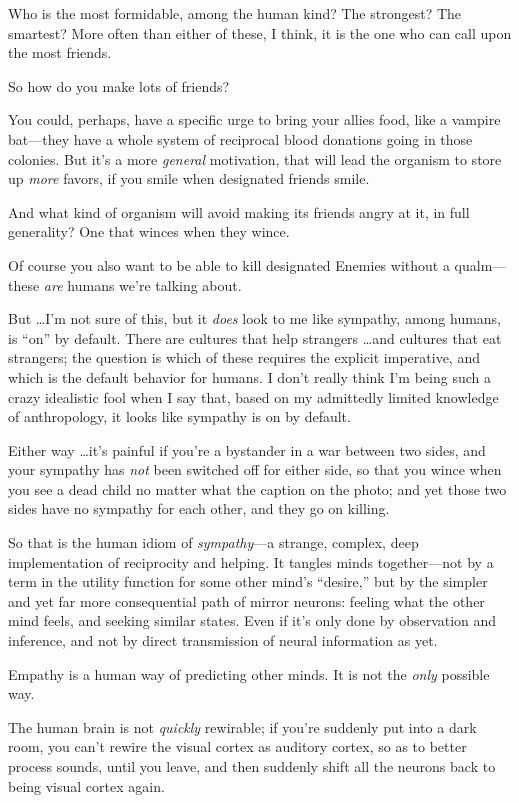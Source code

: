 {
 Who is the most formidable, among the human kind? The strongest?
The smartest? More often than either of these, I think, it is the one
who can call upon the most friends.}

{
 So how do you make lots of friends?}

{
 You could, perhaps, have a specific urge to bring your allies
food, like a vampire bat---they have a whole system of reciprocal blood
donations going in those colonies. But it's a more
\textit{general} motivation, that will lead the organism to store up
\textit{more} favors, if you smile when designated friends smile.}

{
 And what kind of organism will avoid making its friends angry at
it, in full generality? One that winces when they wince.}

{
 Of course you also want to be able to kill designated Enemies
without a qualm---these \textit{are} humans we're
talking about.}

{
 But \ldots I'm not sure of this, but it
\textit{does} look to me like sympathy, among humans, is
``on'' by default. There are
cultures that help strangers \ldots and cultures that eat strangers; the
question is which of these requires the explicit imperative, and which
is the default behavior for humans. I don't really
think I'm being such a crazy idealistic fool when I say
that, based on my admittedly limited knowledge of anthropology, it
looks like sympathy is on by default.}

{
 Either way \ldots it's painful if
you're a bystander in a war between two sides, and your
sympathy has \textit{not} been switched off for either side, so that
you wince when you see a dead child no matter what the caption on the
photo; and yet those two sides have no sympathy for each other, and
they go on killing.}

{
 So that is the human idiom of \textit{sympathy}{}---a strange,
complex, deep implementation of reciprocity and helping. It tangles
minds together---not by a term in the utility function for some other
mind's ``desire,''
but by the simpler and yet far more consequential path of mirror
neurons: feeling what the other mind feels, and seeking similar states.
Even if it's only done by observation and inference,
and not by direct transmission of neural information as yet.}

{
 Empathy is a human way of predicting other minds. It is not the
\textit{only} possible way.}

{
 The human brain is not \textit{quickly} rewirable; if
you're suddenly put into a dark room, you
can't rewire the visual cortex as auditory cortex, so
as to better process sounds, until you leave, and then suddenly shift
all the neurons back to being visual cortex again.}

